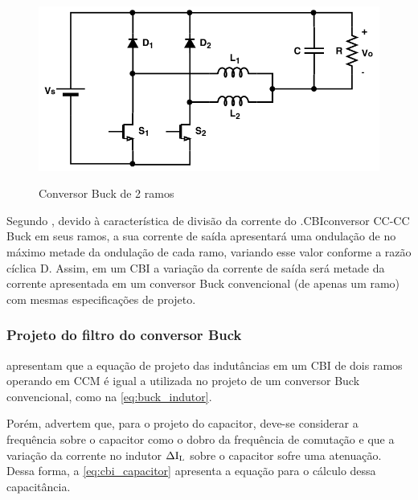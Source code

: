             \begin{figure}[H]
            	\centering
            	\caption{Conversor Buck \interleaved de 2 ramos}
            	\includegraphics[scale=1]{pdf/interleaved/conversor_interleaved.pdf}
            	\label{fig:c_buck_interl}
            \end{figure}
            
            Segundo , devido à característica de divisão da corrente do \abreviatura.{CBI}{conversor \mbox{CC-CC} Buck \interleaved} em seus ramos, a sua corrente de saída apresentará uma ondulação de no máximo metade da ondulação de cada ramo, variando esse valor conforme a razão cíclica D. Assim, em um CBI a variação da corrente de saída será metade da corrente apresentada em um conversor Buck convencional (de apenas um ramo) com mesmas especificações de projeto.
            
            \subsubsection{Projeto do filtro do conversor Buck \interleaved} \label{cap:fund_elp_inter_func}
            
             apresentam que a equação de projeto das indutâncias em um CBI de dois ramos operando em CCM é igual a utilizada no projeto de um conversor Buck convencional, como na \autoref{eq:buck_indutor}. 
            
            Porém,  advertem que, para o projeto do capacitor, deve-se considerar a frequência sobre o capacitor como o dobro da frequência de comutação e que a variação da corrente no indutor $\Delta\text{I}_\text{L}$ sobre o capacitor sofre uma atenuação. Dessa forma, a \autoref{eq:cbi_capacitor} apresenta a equação para o cálculo dessa capacitância. 
            
